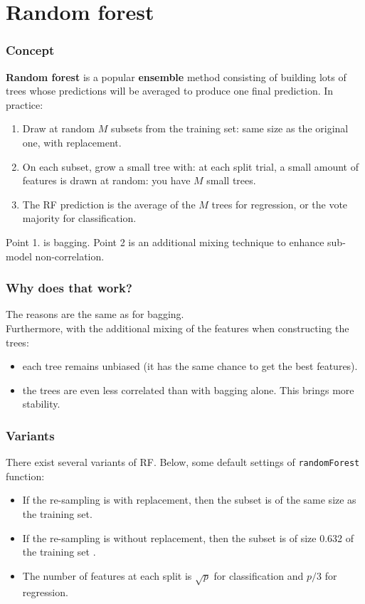 \section{Random forest}
\begin{frame}
\frametitle{Concept}
{\bf Random forest} is a popular {\bf ensemble} method consisting of building lots of trees whose predictions will be averaged to produce one final prediction. In practice: 
\begin{enumerate}
\item Draw at random $M$ subsets from the training set: same size as the original one, with replacement. 
\item On each subset, grow a small tree with: at each split trial, a small amount of features is drawn at random: you have $M$ small trees.
\item The RF prediction is the average of the $M$ trees for regression, or the vote majority for classification.\\
\end{enumerate}
Point 1. is bagging. Point 2 is an additional mixing technique to enhance sub-model non-correlation.
\end{frame}
\begin{frame}
\frametitle{Why does that work?}
The reasons are the same as for bagging.\\
\vspace{0.3cm} 
Furthermore, with the additional mixing of the features when constructing the trees:
\begin{itemize}
\item each tree remains unbiased (it has the same chance to get the best features).
\item the trees are even less correlated than with bagging alone. This brings more stability.
\end{itemize}
\end{frame}
\begin{frame}
\frametitle{Variants}
There exist several variants of RF. Below, some default settings of {\tt randomForest} function:
\begin{itemize}
\item If the re-sampling is with replacement, then the subset is of the same size as the training set.
\item If the re-sampling is without replacement, then the subset is of size 0.632 of the training set . 
\item The number of features at each split is $\sqrt{p}$ for classification and $p/3$ for regression. 
\end{itemize}
\end{frame}
